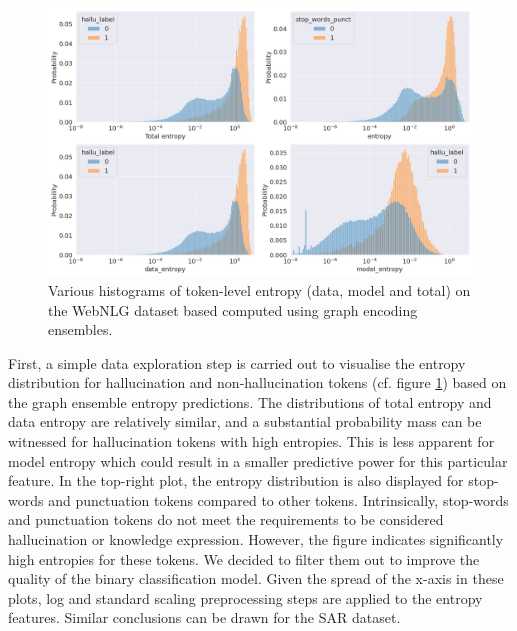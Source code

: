 \begin{figure}[!ht]
    \centering
    \includegraphics[width=0.85\linewidth]{figures/eval/entropy_pred_power/entropy_hist.png}
    \caption{Various histograms of token-level entropy (data, model and total) on the WebNLG dataset based computed using graph encoding ensembles.}
    \label{fig:entropy-hists}
\end{figure}

First, a simple data exploration step is carried out to visualise the entropy distribution for hallucination and non-hallucination tokens (cf. figure \ref{fig:entropy-hists}) based on the graph ensemble entropy predictions. The distributions of total entropy and data entropy are relatively similar, and a substantial probability mass can be witnessed for hallucination tokens with high entropies. This is less apparent for model entropy which could result in a smaller predictive power for this particular feature. In the top-right plot, the entropy distribution is also displayed for stop-words and punctuation tokens compared to other tokens. Intrinsically, stop-words and punctuation tokens do not meet the requirements to be considered hallucination or knowledge expression. However, the figure indicates significantly high entropies for these tokens. We decided to filter them out to improve the quality of the binary classification model. Given the spread of the x-axis in these plots, log and standard scaling preprocessing steps are applied to the entropy features. Similar conclusions can be drawn for the SAR dataset. 



